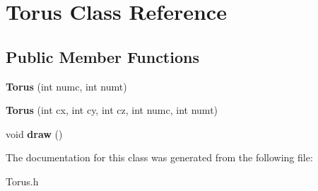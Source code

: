 \hypertarget{class_torus}{}\section{Torus Class Reference}
\label{class_torus}
\subsection*{Public Member Functions}
\begin{DoxyCompactItemize}
\item 
\mbox{\label{class_torus_aef6376c3760a3a7226bd38392b0cb5d9}} 
{\bfseries Torus} (int numc, int numt)
\item 
\mbox{\label{class_torus_aa2820070909448b22112cd6aa0bfc4bf}} 
{\bfseries Torus} (int cx, int cy, int cz, int numc, int numt)
\item 
\mbox{\label{class_torus_af86832d7a2bd688d2f491e5571235c4f}} 
void {\bfseries draw} ()
\end{DoxyCompactItemize}


The documentation for this class was generated from the following file\+:\begin{DoxyCompactItemize}
\item 
Torus.\+h\end{DoxyCompactItemize}
